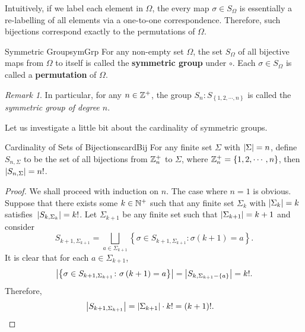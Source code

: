 \documentclass[math]{amznotes}
\theoremstyle{remark}
\newtheorem*{remark}{Remark}
\newcommand{\0}{\mathbf{0}}
\newcommand{\1}{\mathbf{1}}
\begin{document}
Intuitively, if we label each element in $\Omega$, the every map $\sigma \in S_{\Omega}$ is essentially a re-labelling of all elements via a one-to-one correspondence. Therefore, such bijections correspond exactly to the permutations of $\Omega$.
\begin{dfnbox}{Symmetric Group}{symGrp}
    For any non-empty set $\Omega$, the set $S_{\Omega}$ of all bijective maps from $\Omega$ to itself is called the {\color{red} \textbf{symmetric group}} under $\circ$. Each $\sigma \in S_{\Omega}$ is called a {\color{red} \textbf{permutation}} of $\Omega$.
\end{dfnbox}
\begin{notebox}
    \begin{remark}
        In particular, for any $n \in \mathbb{Z}^+$, the group $S_n \colon S_{\left\{1, 2, \cdots, n\right\}}$ is called the \textit{symmetric group of degree $n$}.
    \end{remark}
\end{notebox}
Let us investigate a little bit about the cardinality of symmetric groups.
\begin{probox}{Cardinality of Sets of Bijections}{cardBij}
    For any finite set $\Sigma$ with ${\left\lvert {\Sigma} \right\rvert} = n$, define $S_{n, \Sigma}$ to be the set of all bijections from $\mathbb{Z}_{n}^+$ to $\Sigma$, where $\mathbb{Z}_{n}^+ = \left\{1, 2, \cdots, n\right\}$, then ${\left\lvert {S_{n, \Sigma}} \right\rvert} = n!$.
    \tcblower
    \begin{proof}
        We shall proceed with induction on $n$. The case where $n = 1$ is obvious. Suppose that there exists some $k \in \mathbb{N}^+$ such that any finite set $\Sigma_k$ with ${\left\lvert {\Sigma_k} \right\rvert} = k$ satisfies~${\left\lvert {S_{k, \Sigma_k}} \right\rvert} = k!$. Let $\Sigma_{k + 1}$ be any finite set such that ${\left\lvert {\Sigma_{k + 1}} \right\rvert} = k + 1$ and consider 
        \begin{equation*}
            S_{k + 1, \Sigma_{k + 1}} = \bigsqcup_{a \in \Sigma_{k + 1}}\left\{\sigma \in S_{k + 1, \Sigma_{k + 1}} \colon \sigma\left(k + 1\right) = a\right\}.
        \end{equation*}
        It is clear that for each $a \in \Sigma_{k + 1}$, 
        \begin{equation*}
            {\left\lvert {\left\{\sigma \in S_{k + 1, \Sigma_{k + 1}} \colon \sigma\left(k + 1\right) = a\right\}} \right\rvert} = {\left\lvert {S_{k, \Sigma_{k + 1} - \left\{a\right\}}} \right\rvert} = k!.
        \end{equation*}
        Therefore, 
        \begin{align*}
            {\left\lvert {S_{k + 1, \Sigma_{k + 1}}} \right\rvert} & = {\left\lvert {\Sigma_{k + 1}} \right\rvert} \cdot k! = \left(k + 1\right)!.
        \end{align*}
    \end{proof}
\end{probox}
\end{document}
